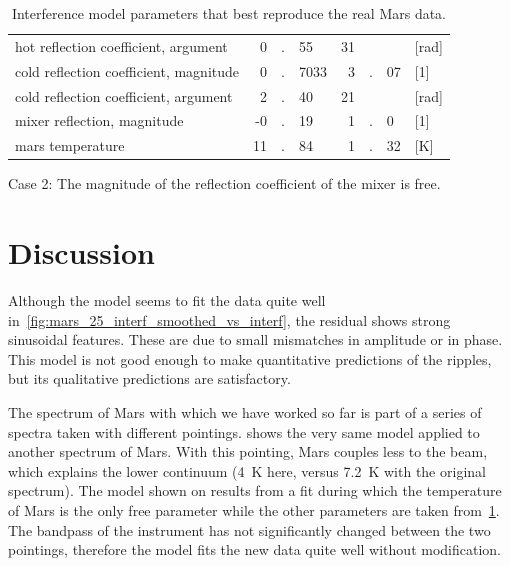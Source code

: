 \begin{table}
\begin{tabular}{l r@{}c@{}l r@{}c@{}l l}
            hot reflection coefficient, argument         &  0&.&55   & 31& &     & [\si{\radian}] \\
            cold reflection coefficient, magnitude       &  0&.&7033 &  3&.&07   & [1]            \\
            cold reflection coefficient, argument        &  2&.&40   & 21& &     & [\si{\radian}] \\
            mixer reflection, magnitude                  & -0&.&19   &  1&.&0    & [1]            \\
            mars temperature                             & 11&.&84   &  1&.&32   & [\si{\kelvin}] \\
        \bottomrule
    \end{tabular}
    \caption*{Case 2: The magnitude of the reflection coefficient of the mixer is free.}
    \caption{Interference model parameters that best reproduce the real Mars data.}
    \label{tab:mars_full_model}
\end{table}



\FloatBarrier



\section{Discussion}

Although the model seems to fit the data quite well in~\cref{fig:mars_25_interf_smoothed_vs_interf}, the residual shows strong sinusoidal features.
These are due to small mismatches in amplitude or in phase.
This model is not good enough to make quantitative predictions of the ripples, but its qualitative predictions are satisfactory.

The spectrum of Mars with which we have worked so far is part of a series of spectra taken with different pointings.
 shows the very same model applied to another spectrum of Mars.
With this pointing, Mars couples less to the beam, which explains the lower continuum (\SI{4}{\kelvin} here, versus \SI{7.2}{\kelvin} with the original spectrum).
The model shown on  results from a fit during which the temperature of Mars is the only free parameter while the other parameters are taken from~\cref{tab:mars_full_model}.
The bandpass of the instrument has not significantly changed between the two pointings, therefore the model fits the new data quite well without modification.

